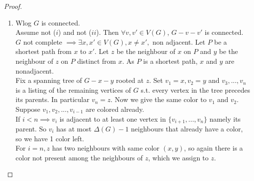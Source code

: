 \begin{proof}
\begin{enumerate}
\begin{center}
        \end{center}
        \item Wlog $G$ is connected.\\
    Assume not ($i$) and not ($ii$). Then $\forall v,v'\in V(G)$, $G-v-v'$ is connected.\\
    $G$ not complete $\implies \exists x,x'\in V(G), x\neq x',$ non adjacent. Let $P$ be a shortest path from $x$ to $x'$. Let $z$ be the neighbour of $x$ on $P$ and $y$ be the neighbour of $z$ on $P$ distinct from $x$. As $P$ is a shortest path, $x$ and $y$ are nonadjacent.\\
    Fix a spanning tree of $G-x-y$ rooted at $z$. Set $v_1=x,v_2=y$ and $v_3,...,v_n$ is a listing of the remaining vertices of $G$ s.t. every vertex in the tree precedes its parents. In particular $v_n=z$. Now we give the same color to $v_1$ and $v_2$.\\
    Suppose $v_1,v_2,...,v_{i-1}$ are colored already. \\
    If $i<n\implies v_i$ is adjacent to at least one vertex in $\{v_{i+1},...,v_n\}$ namely its parent. So $v_i$ has at most $\Delta(G)-1$ neighbours that already have a color, so we have 1 color left.\\
    For $i=n,z$ has two neighbours with same color $(x,y)$, so again there is a color not present among the neighbours of $z$, which we assign to $z$.\\
    \begin{center}
        \end{center}
\end{enumerate}
\end{proof}
